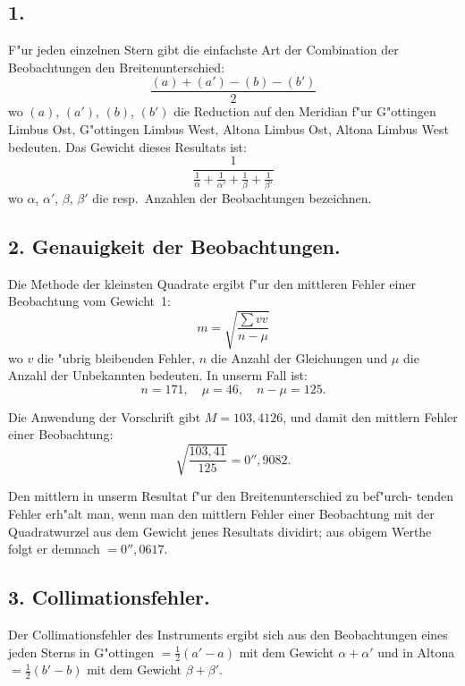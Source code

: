 \documentclass[12pt,a4paper]{article}
\theoremstyle{plain}
\theoremstyle{definition}
\theoremstyle{remark}
\begin{document}
\subsection*{1.}

F"ur jeden einzelnen Stern gibt die einfachste Art der Combination der
Beobachtungen den Breitenunterschied:
\[
\frac{(a) + (a') - (b) - (b')}{2}
\]
wo $(a)$, $(a')$, $(b)$, $(b')$ die Reduction auf den Meridian f"ur G"ottingen
Limbus Ost, G"ottingen Limbus West, Altona Limbus Ost, Altona Limbus
West bedeuten. Das Gewicht dieses Resultats ist:
\[
\frac{1}{\frac{1}{\alpha} + \frac{1}{\alpha'} + \frac{1}{\beta} + \frac{1}{\beta'}}
\]
wo $\alpha$, $\alpha'$, $\beta$, $\beta'$ die resp.~Anzahlen der Beobachtungen bezeichnen.

\subsection*{2. Genauigkeit der Beobachtungen.}

Die Methode der kleinsten Quadrate ergibt f"ur den mittleren Fehler einer
Beobachtung vom Gewicht~1:
\[
m = \sqrt{\frac{\sum vv}{n - \mu}}
\]
wo $v$ die "ubrig bleibenden Fehler, $n$ die Anzahl der Gleichungen und
$\mu$ die Anzahl der Unbekannten bedeuten. In unserm Fall ist:
\[
n = 171, \quad \mu = 46, \quad n - \mu = 125.
\]

Die Anwendung der Vorschrift gibt $M = 103{,}4126$, und damit den mittlern
Fehler einer Beobachtung:
\[
\sqrt{\frac{103{,}41}{125}} = 0''{,}9082.
\]

Den mittlern in unserm Resultat f"ur den Breitenunterschied zu bef"urch-
tenden Fehler erh"alt man, wenn man den mittlern Fehler einer Beobachtung
mit der Quadratwurzel aus dem Gewicht jenes Resultats dividirt; aus obigem
Werthe folgt er demnach $= 0''{,}0617$.

\subsection*{3. Collimationsfehler.}

Der Collimationsfehler des Instruments ergibt sich aus den Beobachtungen
eines jeden Sterns in G"ottingen $= \frac{1}{2}(a' - a)$ mit dem Gewicht $\alpha + \alpha'$
und in Altona $= \frac{1}{2}(b' - b)$ mit dem Gewicht $\beta + \beta'$.
\end{document}
